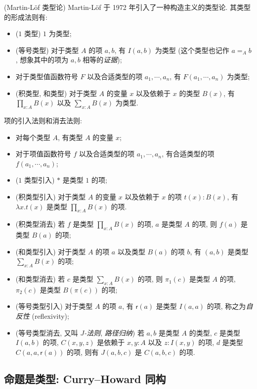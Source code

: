 \begin{example}
	{(Martin-L\"of 类型论)}
	Martin-L\"of 于 1972 年引入了一种构造主义的类型论.
	其类型的形成法则有:
	\begin{itemize}
		\item ($1$ 类型) $1$ 为类型;
		\item (等号类型) 对于类型 $A$ 的项 $a,b$, 有 $I(a,b)$ 为类型 (这个类型也记作 $a=_A b$, 想象其中的项为 $a,b$ 相等的\emph{证据});
		\item 对于类型值函数符号 $F$ 以及合适类型的项 $a_1,\cdots,a_n$, 有 $F(a_1,\cdots,a_n)$ 为类型;
		\item (积类型, 和类型) 对于类型 $A$ 的变量 $x$ 以及依赖于 $x$ 的类型 $B(x)$, 有 $\prod_{x: A}B(x)$ 以及 $\sum_{x: A}B(x)$ 为类型.
	\end{itemize}
	项的引入法则和消去法则:
	\begin{itemize}
		\item 对每个类型 $A$, 有类型 $A$ 的变量 $x$;%
		\item 对于项值函数符号 $f$ 以及合适类型的项 $a_1,\cdots,a_n$, 有合适类型的项 $f(a_1,\cdots,a_n)$;
		\item ($1$ 类型引入) $*$ 是类型 $1$ 的项;
		\item (积类型引入) 对于类型 $A$ 的变量 $x$ 以及依赖于 $x$ 的项 $t(x) : B(x)$, 有 $\lambda x. t(x)$ 是类型 $\prod_{x: A}B(x)$ 的项.
		\item (积类型消去) 若 $f$ 是类型 $\prod_{x: A}B(x)$ 的项, $a$ 是类型 $A$ 的项, 则 $f(a)$ 是类型 $B(a)$ 的项;
		\item (和类型引入) 对于类型 $A$ 的项 $a$ 以及类型 $B(a)$ 的项 $b$, 有 $(a,b)$ 是类型 $\sum_{x : A} B(x)$ 的项;
		\item (和类型消去) 若 $c$ 是类型 $\sum_{x : A} B(x)$ 的项, 则 $\pi_1(c)$ 是类型 $A$ 的项, $\pi_2(c)$ 是类型 $B(\pi(c))$ 的项;
		\item (等号类型引入) 对于类型 $A$ 的项 $a$, 有 $\mathsf {r}(a)$ 是类型 $I(a,a)$ 的项, 称之为\emph{自反性} (reflexivity);
		\item (等号类型消去, 又叫 \emph{$J$-法则}, \emph{路径归纳}) 若 $a,b$ 是类型 $A$ 的类型, $c$ 是类型 $I(a,b)$ 的项, $C(x,y,z)$ 是依赖于 $x,y : A$ 以及 $z : I(x,y)$ 的项, $d$ 是类型 $C(a,a,\mathsf {r}(a))$ 的项, 则有 $J(a,b,c)$ 是 $C(a,b,c)$ 的项.
	\end{itemize}
	
\end{example}

\subsection{命题是类型: Curry--Howard 同构}

